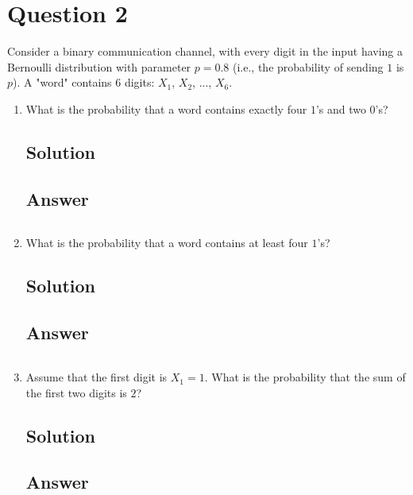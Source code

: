 \documentclass[12pt]{article}
\begin{document}
	
	\section*{Question 2}
	
	\noindent Consider a binary communication channel, with every digit in the input having a Bernoulli distribution with parameter $p = 0.8$ (i.e., the probability of sending $1$ is $p$). A "word" contains 6 digits: $X_1$, $X_2$, ..., $X_6$.
	
	\bigskip
	
	\begin{enumerate}[start=1,label={\bfseries Part \arabic*:},leftmargin=0in]
		\bigskip\item What is the probability that a word contains exactly four $1$'s and two $0$'s?
		
		\subsection*{Solution}
		
		\subsection*{Answer}
		
			\[\boxed{}\]
		
		\bigskip\item What is the probability that a word contains at least four $1$'s?
		
		\subsection*{Solution}
		
		\subsection*{Answer}
		
			\[\boxed{}\]
			
		\bigskip\item Assume that the first digit is $X_1 = 1$. What is the probability that the sum of the first two digits is $2$?
		
		\subsection*{Solution}
		
		\subsection*{Answer}
		
			\[\boxed{}\]
	\end{enumerate}
	
\end{document}
